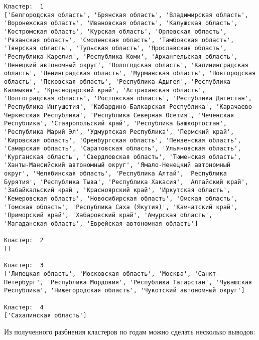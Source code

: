 \documentclass[11pt]{article}
\begin{document}
\begin{Verbatim}[commandchars=\\\{\}]
Кластер:  1
['Белгородская область', 'Брянская область', 'Владимирская область', 'Воронежская область', 'Ивановская область', 'Калужская область', 'Костромская область', 'Курская область', 'Орловская область', 'Рязанская область', 'Смоленская область', 'Тамбовская область', 'Тверская область', 'Тульская область', 'Ярославская область', 'Республика Карелия', 'Республика Коми', 'Архангельская область', 'Ненецкий автономный округ', 'Вологодская область', 'Калинингpадская область', 'Ленинградская область', 'Мурманская область', 'Новгородская область', 'Псковская область', 'Республика Адыгея', 'Республика Калмыкия', 'Краснодарский край', 'Астраханская область', 'Волгоградская область', 'Ростовская область', 'Республика Дагестан', 'Республика Ингушетия', 'Кабардино-Балкарская Республика', 'Карачаево-Черкесская Республика', 'Республика Северная Осетия', 'Чеченская Республика', 'Ставропольский край', 'Республика Башкортостан', 'Республика Марий Эл', 'Удмуртская Республика', 'Пермский край', 'Кировская область', 'Оренбургская область', 'Пензенская область', 'Самарская область', 'Саратовская область', 'Ульяновская область', 'Курганская область', 'Свердловская область', 'Тюменская область', 'Ханты-Мансийский автономный округ', 'Ямало-Ненецкий автономный округ', 'Челябинская область', 'Республика Алтай', 'Республика Бурятия', 'Республика Тыва', 'Республика Хакасия', 'Алтайский край', 'Забайкальский край', 'Красноярский край', 'Иркутская область', 'Кемеровская область', 'Новосибирская область', 'Омская область', 'Томская область', 'Республика Саха (Якутия)', 'Камчатский край', 'Приморский край', 'Хабаровский край', 'Амурская область', 'Магаданская область', 'Еврейская автономная область']

Кластер:  2
[]

Кластер:  3
['Липецкая область', 'Московская область', 'Москва', 'Санкт-Петербург', 'Республика Мордовия', 'Республика Татарстан', 'Чувашская Республика', 'Нижегородская область', 'Чукотский автономный округ']

Кластер:  4
['Сахалинская область']

    \end{Verbatim}

    Из полученного разбиения кластеров по годам можно сделать несколько
выводов:
\end{document}
